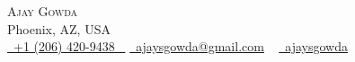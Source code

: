 \documentclass[letterpaper,11pt]{article}
\begin{document}


\begin{center}
    {\Huge \scshape Ajay Gowda} \\ \vspace{1pt}
    Phoenix, AZ, USA \\ \vspace{1pt}
    \small \href{tel:+12064209438}{ \raisebox{-0.1\height}\faPhone\ \underline{+1 (206) 420-9438} ~}
    \href{mailto:ajaysgowda@gmail.com}{\raisebox{-0.2\height}\faEnvelope\  \underline{ajaysgowda@gmail.com}} ~
    \href{https://linkedin.com/in/ajaysgowda}{\raisebox{-0.2\height}\faLinkedinSquare\ \underline{ajaysgowda}}  ~
    \vspace{-8pt}
\end{center}

\end{document}
